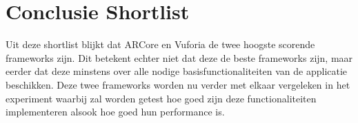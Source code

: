 \section{Conclusie Shortlist}
Uit deze shortlist blijkt dat ARCore en Vuforia de twee hoogste scorende frameworks zijn. Dit betekent echter niet dat deze de beste frameworks zijn, maar eerder dat deze minstens over alle nodige basisfunctionaliteiten van de applicatie beschikken. Deze twee frameworks worden nu verder met elkaar vergeleken in het experiment waarbij zal worden getest hoe goed zijn deze functionaliteiten implementeren alsook hoe goed hun performance is.